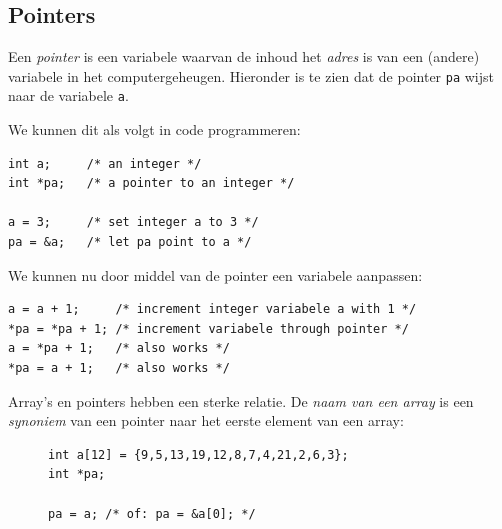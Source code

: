 \documentclass[a4paper,10pt,fleqn,twoside]{article}
\begin{document}
\subsection{Pointers}
Een \textsl{pointer} is een variabele waarvan de inhoud het \textsl{adres} is van een (andere) variabele in het computergeheugen. Hieronder is te zien dat de pointer \lstinline|pa| wijst naar de variabele \lstinline|a|.

\begin{figure}[!ht]
\centering
{}
\end{figure}

We kunnen dit als volgt in code programmeren:

\begin{lstlisting}
int a;     /* an integer */
int *pa;   /* a pointer to an integer */

a = 3;     /* set integer a to 3 */
pa = &a;   /* let pa point to a */
\end{lstlisting}

We kunnen nu door middel van de pointer een variabele aanpassen:

\begin{lstlisting}
a = a + 1;     /* increment integer variabele a with 1 */
*pa = *pa + 1; /* increment variabele through pointer */
a = *pa + 1;   /* also works */
*pa = a + 1;   /* also works */
\end{lstlisting}

Array's en pointers hebben een sterke relatie. De \textsl{naam van een array} is een \textsl{synoniem} van een pointer naar het eerste element van een array:

\begin{figure}[!ht]
\begin{lstlisting}
int a[12] = {9,5,13,19,12,8,7,4,21,2,6,3};
int *pa;

pa = a; /* of: pa = &a[0]; */
\end{lstlisting}
\end{figure}

\begin{figure}[!ht]
\centering
{}
\end{figure}
\end{document}
